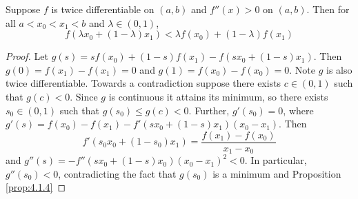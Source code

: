 \begin{subappendices}
    \begin{prop}\label{prop:4.1.5}
        Suppose $f$ is twice differentiable on $(a,b)$ and $f''(x) > 0$ on $(a,b)$. Then for all $a < x_0 < x_1 < b$ and $\lambda \in (0,1)$, $$f(\lambda x_0+(1-\lambda)x_1) < \lambda f(x_0) + (1-\lambda)f(x_1)$$
    \end{prop}
    \begin{proof}
        Let $g(s) = sf(x_0) + (1-s)f(x_1) - f(sx_0+(1-s)x_1)$. Then $g(0) = f(x_1) - f(x_1) = 0$ and $g(1) = f(x_0) - f(x_0) = 0$. Note $g$ is also twice differentiable. Towards a contradiction suppose there exists $c \in (0,1)$ such that $g(c) < 0$. Since $g$ is continuous it attains its minimum, so there exists $s_0 \in (0,1)$ such that $g(s_0) \leq g(c) < 0$. Further, $g'(s_0) = 0$, where $g'(s) = f(x_0) - f(x_1) - f'(sx_0+(1-s)x_1)(x_0-x_1)$. Then $$f'(s_0x_0+(1-s_0)x_1) = \frac{f(x_1)-f(x_0)}{x_1-x_0}$$ and $g''(s) = -f''(sx_0 + (1-s)x_0)(x_0-x_1)^2 < 0$. In particular, $g''(s_0) < 0$, contradicting the fact that $g(s_0)$ is a minimum and Proposition \ref{prop:4.1.4}
    \end{proof}




\end{subappendices}


